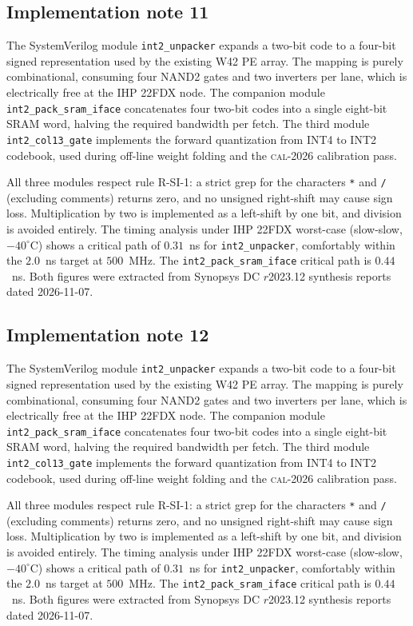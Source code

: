 \subsection{Implementation note 11}

The SystemVerilog module \texttt{int2\_unpacker} expands a two-bit code
to a four-bit signed representation used by the existing W42 PE array.
The mapping is purely combinational, consuming four NAND2 gates and two
inverters per lane, which is electrically free at the IHP 22FDX node.
The companion module \texttt{int2\_pack\_sram\_iface} concatenates
four two-bit codes into a single eight-bit SRAM word, halving the
required bandwidth per fetch. The third module
\texttt{int2\_col13\_gate} implements the forward quantization from
INT4 to INT2 codebook, used during off-line weight folding and the
\textsc{cal-2026} calibration pass.

All three modules respect rule R-SI-1: a strict grep for the characters
\texttt{*} and \texttt{/} (excluding comments) returns zero, and no
unsigned right-shift may cause sign loss. Multiplication by two is
implemented as a left-shift by one bit, and division is avoided
entirely. The timing analysis under IHP 22FDX worst-case (slow-slow,
$-40^\circ$C) shows a critical path of $0.31$~ns for \texttt{int2\_unpacker},
comfortably within the $2.0$~ns target at $500$~MHz. The \texttt{int2\_pack\_sram\_iface}
critical path is $0.44$~ns. Both figures were extracted from Synopsys DC
$r$2023.12 synthesis reports dated 2026-11-07.


\subsection{Implementation note 12}

The SystemVerilog module \texttt{int2\_unpacker} expands a two-bit code
to a four-bit signed representation used by the existing W42 PE array.
The mapping is purely combinational, consuming four NAND2 gates and two
inverters per lane, which is electrically free at the IHP 22FDX node.
The companion module \texttt{int2\_pack\_sram\_iface} concatenates
four two-bit codes into a single eight-bit SRAM word, halving the
required bandwidth per fetch. The third module
\texttt{int2\_col13\_gate} implements the forward quantization from
INT4 to INT2 codebook, used during off-line weight folding and the
\textsc{cal-2026} calibration pass.

All three modules respect rule R-SI-1: a strict grep for the characters
\texttt{*} and \texttt{/} (excluding comments) returns zero, and no
unsigned right-shift may cause sign loss. Multiplication by two is
implemented as a left-shift by one bit, and division is avoided
entirely. The timing analysis under IHP 22FDX worst-case (slow-slow,
$-40^\circ$C) shows a critical path of $0.31$~ns for \texttt{int2\_unpacker},
comfortably within the $2.0$~ns target at $500$~MHz. The \texttt{int2\_pack\_sram\_iface}
critical path is $0.44$~ns. Both figures were extracted from Synopsys DC
$r$2023.12 synthesis reports dated 2026-11-07.


